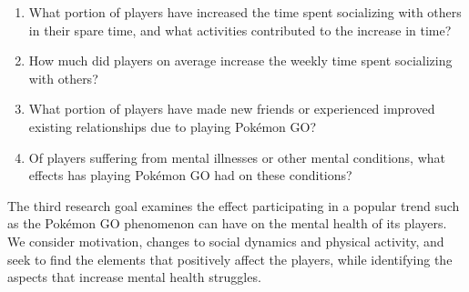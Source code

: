 \begin{enumerate}
	\item What portion of players have increased the time spent socializing with others in their spare time, and what activities contributed to the increase in time?
	\item How much did players on average increase the weekly time spent socializing with others?
	\item What portion of players have made new friends or experienced improved existing relationships due to playing Pokémon GO?
	\item Of players suffering from mental illnesses or other mental conditions, what effects has playing Pokémon GO had on these conditions?
\end{enumerate}

The third research goal examines the effect participating in a popular trend such as the Pokémon GO phenomenon can have on the mental health of its players. We consider motivation, changes to social dynamics and physical activity, and seek to find the elements that positively affect the players, while identifying the aspects that increase mental health struggles.